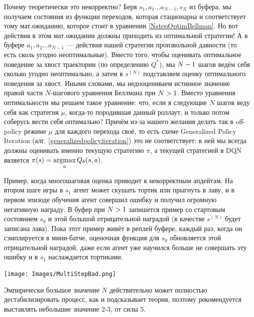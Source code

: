 Почему теоретически это некорректно? Беря $s_1, a_1 \dots a_{N-1}, s_N$ из буфера, мы получаем состояния из функции переходов, которая стационарна и соответствует тому мат.ожиданию, которое стоит в уравнении \eqref{NstepOptimBellman}. Но вот действия в этом мат.ожидании должны приходить из оптимальной стратегии! А в буфере $a_1, a_2 \dots a_{N-1}$ --- действия нашей стратегии произвольной давности (то есть сколь угодно неоптимальные). Вместо того, чтобы оценивать оптимальное поведение за хвост траектории (по определению $Q^*$), мы $N \HM- 1$ шагов ведём себя сколько угодно неоптимально, а затем в $s^{(N)}$ подставляем оценку оптимального поведения за хвост. Иными словами, мы недооцениваем истинное значение правой части $N$-шагового уравнения Беллмана при $N \HM> 1$. Вместо уравнения оптимальности мы решаем такое уравнение: что, если я следующие $N$ шагов веду себя как стратегия $\mu$, когда-то породившая данный роллаут, и только потом соберусь вести себя оптимально? Причём из-за нашего желания делать так в off-policy режиме $\mu$ для каждого перехода своё, то есть схеме Generalized Policy Iteration (алг. \ref{generalizedpolicyiteration}) это не соответствует: в ней мы всегда должны оценивать именно текущую стратегию $\pi$, а текущей стратегией в DQN является $\pi(s) \HM= \argmax\limits_{a} Q_{\theta}(s, a)$.

\begin{exampleBox}[righthand ratio=0.2, sidebyside, sidebyside align=center, lower separated=false]{}
Пример, когда многошаговая оценка приводит к некорректным апдейтам. На втором шаге игры в $s_1$ агент может скушать тортик или прыгнуть в лаву, и в первом эпизоде обучения агент совершил ошибку и получил огромную негативную награду. В буфер при $N \HM> 1$ запишется пример со стартовым состоянием $s_0$ и этой большой отрицательной наградой (в качестве $s^{(N)}$ будет записана лава). Пока этот пример живёт в реплей буфере, каждый раз, когда он сэмплируется в мини-батче, оценочная функция для $s_0$ обновляется этой отрицательной наградой, даже если агент уже научился больше не совершать эту ошибку и в $s_1$ наслаждается тортиками.

\tcblower
\vspace{-0.3cm}
\begin{adjustwidth}{-0.6cm}{}
\texttt{[image: Images/MultiStepBad.png]} \hspace*{-1cm}
\end{adjustwidth}
\end{exampleBox}

\begin{remark}
Эмпирически большое значение $N$ действительно может полностью дестабилизировать процесс, как и подсказывает теория, поэтому рекомендуется выставлять небольшие значение 2-3, от силы 5. 
\end{remark}

